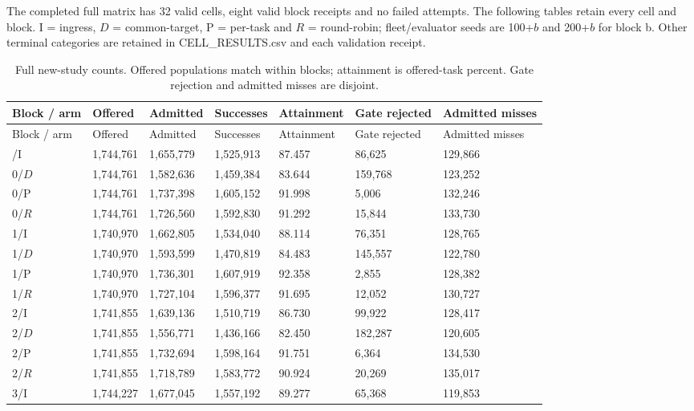 \documentclass[11pt,a4paper]{article}
\begin{document}
The completed full matrix has 32 valid cells, eight valid block receipts and no failed attempts. The following tables retain every cell and block. I = ingress, $D$ = common-target, P = per-task and $R$ = round-robin; fleet/evaluator seeds are 100+$b$ and 200+$b$ for block b. Other terminal categories are retained in CELL\_RESULTS.csv and each validation receipt.

\begingroup
\small
\begin{xltabular}{\textwidth}{@{}YYYYYYY@{}}
\caption{Full new-study counts. Offered populations match within blocks; attainment is offered-task percent. Gate rejection and admitted misses are disjoint.}\label{tab:E1} \\
\toprule
Block / arm & Offered & Admitted & Successes & Attainment & Gate rejected & Admitted misses \\
\midrule\endfirsthead
\toprule
Block / arm & Offered & Admitted & Successes & Attainment & Gate rejected & Admitted misses \\
\midrule\endhead
\bottomrule{}/I & 1,744,761 & 1,655,779 & 1,525,913 & 87.457 & 86,625 & 129,866 \\
0/$D$ & 1,744,761 & 1,582,636 & 1,459,384 & 83.644 & 159,768 & 123,252 \\
0/P & 1,744,761 & 1,737,398 & 1,605,152 & 91.998 & 5,006 & 132,246 \\
0/$R$ & 1,744,761 & 1,726,560 & 1,592,830 & 91.292 & 15,844 & 133,730 \\
1/I & 1,740,970 & 1,662,805 & 1,534,040 & 88.114 & 76,351 & 128,765 \\
1/$D$ & 1,740,970 & 1,593,599 & 1,470,819 & 84.483 & 145,557 & 122,780 \\
1/P & 1,740,970 & 1,736,301 & 1,607,919 & 92.358 & 2,855 & 128,382 \\
1/$R$ & 1,740,970 & 1,727,104 & 1,596,377 & 91.695 & 12,052 & 130,727 \\
2/I & 1,741,855 & 1,639,136 & 1,510,719 & 86.730 & 99,922 & 128,417 \\
2/$D$ & 1,741,855 & 1,556,771 & 1,436,166 & 82.450 & 182,287 & 120,605 \\
2/P & 1,741,855 & 1,732,694 & 1,598,164 & 91.751 & 6,364 & 134,530 \\
2/$R$ & 1,741,855 & 1,718,789 & 1,583,772 & 90.924 & 20,269 & 135,017 \\
3/I & 1,744,227 & 1,677,045 & 1,557,192 & 89.277 & 65,368 & 119,853 \\

\end{xltabular}
\end{document}
